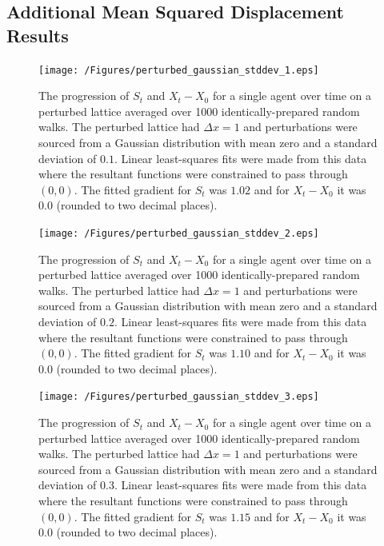 \documentclass[11pt,titlepage,a4paper]{article}
\begin{document}
\pagebreak
\begin{appendix}
	
	\renewcommand\thefigure{\thesection.\arabic{figure}}

	\section{Additional Mean Squared Displacement Results}
	\label{appendix:MSD}
	\setcounter{figure}{0}

		\begin{figure}[tbh]
			\centering
				\texttt{[image: /Figures/perturbed\_gaussian\_stddev\_1.eps]}
			\caption{The progression of $S_t$ and $X_t - X_0$ for a single agent over time on a perturbed lattice averaged over 1000 identically-prepared random walks. The perturbed lattice had $\Delta x = 1$ and perturbations were sourced from a Gaussian distribution with mean zero and a standard deviation of $0.1$. Linear least-squares fits were made from this data where the resultant functions were constrained to pass through $(0,0)$. The fitted gradient for $S_t$ was $1.02$ and for $X_t - X_0$ it was $0.0$ (rounded to two decimal places).}
			\label{fig:perturbed_gaussian_stddev_1}
		\end{figure}

		\clearpage
		\begin{figure}[tbh]
			\centering
				\texttt{[image: /Figures/perturbed\_gaussian\_stddev\_2.eps]}
			\caption{The progression of $S_t$ and $X_t - X_0$ for a single agent over time on a perturbed lattice averaged over 1000 identically-prepared random walks. The perturbed lattice had $\Delta x = 1$ and perturbations were sourced from a Gaussian distribution with mean zero and a standard deviation of $0.2$. Linear least-squares fits were made from this data where the resultant functions were constrained to pass through $(0,0)$. The fitted gradient for $S_t$ was $1.10$ and for $X_t - X_0$ it was $0.0$ (rounded to two decimal places).}
			\label{fig:perturbed_gaussian_stddev_2}
		\end{figure}

		\clearpage
		\begin{figure}[tbh]
			\centering
				\texttt{[image: /Figures/perturbed\_gaussian\_stddev\_3.eps]}
			\caption{The progression of $S_t$ and $X_t - X_0$ for a single agent over time on a perturbed lattice averaged over 1000 identically-prepared random walks. The perturbed lattice had $\Delta x = 1$ and perturbations were sourced from a Gaussian distribution with mean zero and a standard deviation of $0.3$. Linear least-squares fits were made from this data where the resultant functions were constrained to pass through $(0,0)$. The fitted gradient for $S_t$ was $1.15$ and for $X_t - X_0$ it was $0.0$ (rounded to two decimal places).}
			\label{fig:perturbed_gaussian_stddev_3}
		\end{figure}


\end{appendix}
\end{document}
